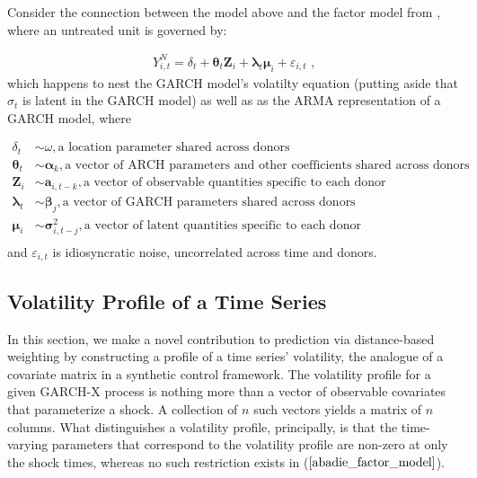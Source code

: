 \documentclass[11pt,3p,review,authoryear]{elsarticle}
\theoremstyle{definition}
\begin{document}
Consider the connection between the model above and the factor model from \citet{abadie2010synthetic}, where an untreated unit is governed by:

\begin{align}
Y^{N}_{i,t} = \delta_{t} + \boldsymbol\theta_{t}\textbf{Z}_{i}+\boldsymbol\lambda_{t}\boldsymbol\mu_{i}+\varepsilon_{i,t} \text{ ,} \label{abadie_factor_model}
\end{align}
which happens to nest the GARCH model's volatilty equation (putting aside that $\sigma_{t}$ is latent in the GARCH model) as well as as the ARMA representation of a GARCH model, where

\begin{align*}
\delta_{t} & \sim \omega,  \text{a location parameter shared across donors}\\
\boldsymbol\theta_{t} & \sim \boldsymbol\alpha_{k},  \text{a vector of ARCH parameters and other coefficients shared across donors} \\
\textbf{Z}_{i} & \sim \boldsymbol a_{i,t-k}, \text{a vector of observable quantities specific to each donor} \\
\boldsymbol \lambda_{t} & \sim \boldsymbol\beta_{j}, \text{a vector of GARCH parameters shared across donors} \\
\boldsymbol \mu_{i} & \sim \boldsymbol \sigma_{i,t-j}^{2}, \text{a vector of latent quantities specific to each donor}   \\
\end{align*}
and $\varepsilon_{i,t}$ is idiosyncratic noise, uncorrelated across time and donors.

    \subsection{Volatility Profile of a Time Series}
    \label{Volatility Shock Profile of a Time Series}
    
    In this section, we make a novel contribution to prediction via distance-based weighting by constructing a profile of a time series' volatility, the analogue of a covariate matrix in a synthetic control framework.  The volatility profile for a given GARCH-X process is nothing more than a vector of observable covariates that parameterize a shock.  A collection of $n$ such vectors yields a matrix of $n$ columns.  What distinguishes a volatility profile, principally, is that the time-varying parameters that correspond to the volatility profile are non-zero at only the shock times, whereas no such restriction exists in ($\ref{abadie_factor_model}$).  
    
\end{document}
